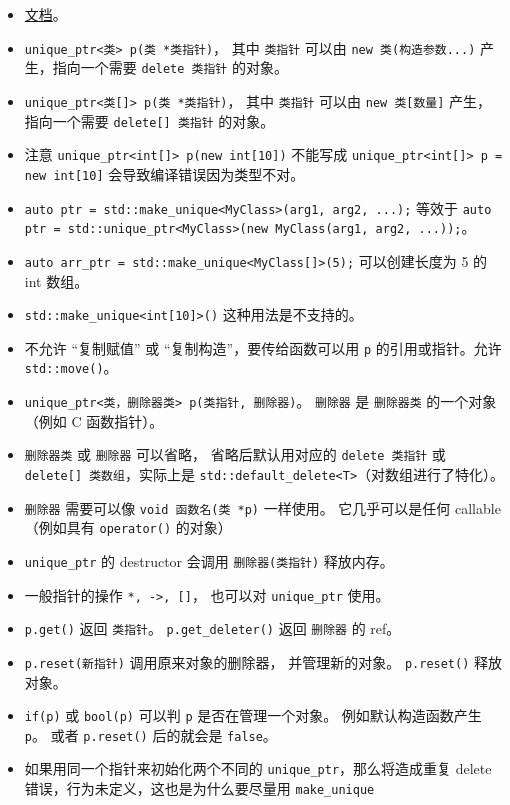 \begin{itemize}
\item \href{https://en.cppreference.com/w/cpp/memory/unique_ptr}{文档}。
\item \verb`unique_ptr<类> p(类 *类指针)`， 其中 \verb`类指针` 可以由 \verb`new 类(构造参数...)` 产生，指向一个需要 \verb`delete 类指针` 的对象。
\item \verb`unique_ptr<类[]> p(类 *类指针)`， 其中 \verb`类指针` 可以由 \verb`new 类[数量]` 产生，指向一个需要 \verb`delete[] 类指针` 的对象。
\item 注意 \verb`unique_ptr<int[]> p(new int[10])` 不能写成 \verb`unique_ptr<int[]> p = new int[10]` 会导致编译错误因为类型不对。
\item \verb`auto ptr = std::make_unique<MyClass>(arg1, arg2, ...);` 等效于 \verb`auto ptr = std::unique_ptr<MyClass>(new MyClass(arg1, arg2, ...));`。
\item \verb`auto arr_ptr = std::make_unique<MyClass[]>(5);` 可以创建长度为 5 的 int 数组。
\item \verb`std::make_unique<int[10]>()` 这种用法是不支持的。
\item 不允许 “复制赋值” 或 “复制构造”，要传给函数可以用 \verb`p` 的引用或指针。允许 \verb`std::move()`。
\item \verb`unique_ptr<类，删除器类> p(类指针, 删除器)`。 \verb`删除器` 是 \verb`删除器类` 的一个对象（例如 C 函数指针）。
\item \verb`删除器类` 或 \verb`删除器` 可以省略， 省略后默认用对应的 \verb`delete 类指针` 或 \verb`delete[] 类数组`，实际上是 \verb`std::default_delete<T>`（对数组进行了特化）。
\item \verb`删除器` 需要可以像 \verb`void 函数名(类 *p)` 一样使用。 它几乎可以是任何 callable（例如具有 \verb`operator()` 的对象）
\item \verb`unique_ptr` 的 destructor 会调用 \verb`删除器(类指针)` 释放内存。
\item 一般指针的操作 \verb`*, ->, []`， 也可以对 \verb`unique_ptr` 使用。
\item \verb`p.get()` 返回 \verb`类指针`。 \verb`p.get_deleter()` 返回 \verb`删除器` 的 ref。
\item \verb`p.reset(新指针)` 调用原来对象的删除器， 并管理新的对象。 \verb`p.reset()` 释放对象。
\item \verb`if(p)` 或 \verb`bool(p)` 可以判 \verb`p` 是否在管理一个对象。 例如默认构造函数产生 \verb`p`。 或者 \verb`p.reset()` 后的就会是 \verb`false`。
\item 如果用同一个指针来初始化两个不同的 \verb`unique_ptr`，那么将造成重复 delete 错误，行为未定义，这也是为什么要尽量用 \verb`make_unique`
\end{itemize}


